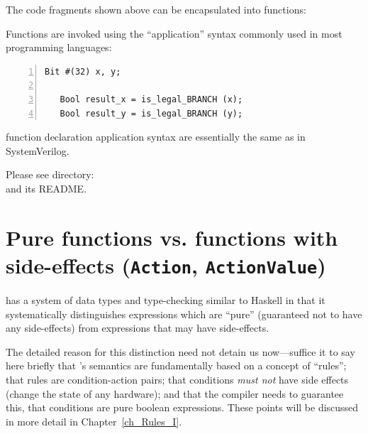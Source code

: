 \label{BSV_functions_2}

The code fragments shown above can be encapsulated into {\BSV}
functions:



Functions are invoked using the ``application'' syntax commonly used
in most programming languages:

{\footnotesize
\begin{Verbatim}[frame=single, numbers=left]
   Bit #(32) x, y;

   Bool result_x = is_legal_BRANCH (x);
   Bool result_y = is_legal_BRANCH (y);
\end{Verbatim}
}

{\BSV} function declaration application syntax are essentially the
same as in SystemVerilog.

\Beginexercise

Please see directory:  \\
and its README.
\Endexercise


\section{Pure functions vs. functions with side-effects ({\tt Action}, {\tt ActionValue})}

\label{Sec_Pure_vs_Side_Effect_functions}


{\BSV} has a system of data types and type-checking similar to Haskell in
that it systematically distinguishes expressions which are ``pure''
(guaranteed not to have any side-effects) from expressions that may
have side-effects.

The detailed reason for this distinction need not detain us
now---suffice it to say here briefly that {\BSV}'s semantics are
fundamentally based on a concept of ``rules''; that rules are
condition-action pairs; that conditions \emph{must not} have side
effects (change the state of any hardware); and that the compiler
needs to guarantee this, {\ie} that conditions are pure boolean
expressions.  These points will be discussed in more detail in
Chapter~\ref{ch_Rules_I}.

